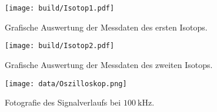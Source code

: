 \begin{figure}
    \centering
    \texttt{[image: build/Isotop1.pdf]}
    \caption{Grafische Auswertung der Messdaten des ersten Isotops.}
    \label{fig:plot1}
\end{figure}

\begin{figure}
    \centering
    \texttt{[image: build/Isotop2.pdf]}
    \caption{Grafische Auswertung der Messdaten des zweiten Isotops.}
    \label{fig:plot2}
\end{figure}

\begin{figure}
    \centering
    \texttt{[image: data/Oszilloskop.png]}
    \caption{Fotografie des Signalverlaufs bei $\SI{100}{\kilo\hertz}$.}
    \label{fig:Oszilloskop}
\end{figure}